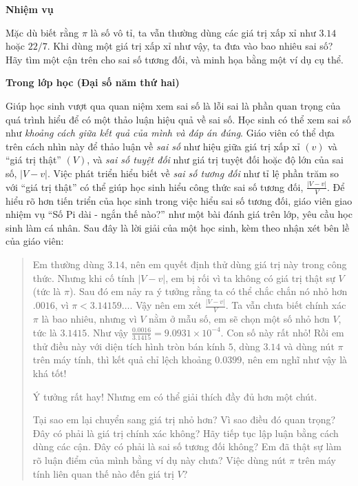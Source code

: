   {
    \textbf{Nhiệm vụ}

    Mặc dù biết rằng $\pi$ là số vô tỉ, ta vẫn thường dùng các giá trị xấp xỉ như $3.14$ hoặc $22/7$. Khi dùng một giá trị xấp xỉ như vậy, ta đưa vào bao nhiêu sai số? Hãy tìm một cận trên cho sai số tương đối, và minh họa bằng một ví dụ cụ thể.

    \textbf{Trong lớp học (Đại số năm thứ hai)}

    Giúp học sinh vượt qua quan niệm xem sai số là lỗi sai là phần quan trọng của quá trình hiểu để có một thảo luận hiệu quả về sai số. Học sinh có thể xem sai số như \emph{khoảng cách giữa kết quả của mình và đáp án đúng}. Giáo viên có thể dựa trên cách nhìn này để thảo luận về \emph{sai số} như hiệu giữa giá trị xấp xỉ $(v)$ và ``giá trị thật'' $(V)$, và \emph{sai số tuyệt đối} như giá trị tuyệt đối hoặc độ lớn của sai số, $\lvert V - v\rvert$. Việc phát triển hiểu biết về \emph{sai số tương đối} như tỉ lệ phần trăm so với ``giá trị thật'' có thể giúp học sinh hiểu công thức sai số tương đối, $\frac{\lvert V - v\rvert}{V}$. Để hiểu rõ hơn tiến triển của học sinh trong việc hiểu sai số tương đối, giáo viên giao nhiệm vụ ``Số Pi dài - ngắn thế nào?'' như một bài đánh giá trên lớp, yêu cầu học sinh làm cá nhân. Sau đây là lời giải của một học sinh, kèm theo nhận xét bên lề của giáo viên:

    \begin{quote}
      Em thường dùng $3.14$, nên em quyết định thử dùng giá trị này trong công thức. Nhưng khi cố tính $\lvert V - v\rvert$, em bị rối vì ta không có giá trị thật sự $V$ (tức là $\pi$). Sau đó em nảy ra ý tưởng rằng ta có thể chắc chắn nó nhỏ hơn $.0016$, vì $\pi < 3.14159\dots$. Vậy nên em xét $\frac{\lvert V - v\rvert}{V}$. Ta vẫn chưa biết chính xác $\pi$ là bao nhiêu, nhưng vì $V$ nằm ở mẫu số, em sẽ chọn một số nhỏ hơn $V$, tức là $3.1415$. Như vậy $\frac{0.0016}{3.1415}=9.0931\times 10^{-4}$. Con số này rất nhỏ! Rồi em thử điều này với diện tích hình tròn bán kính $5$, dùng $3.14$ và dùng nút $\pi$ trên máy tính, thì kết quả chỉ lệch khoảng $0.0399$, nên em nghĩ như vậy là khá tốt!\vspace{\baselineskip}

      \begin{scriptlist}
        \item[Giáo viên:] Ý tưởng rất hay! Nhưng em có thể giải thích đầy đủ hơn một chút.
        
        \item[Giáo viên:] Tại sao em lại chuyển sang giá trị nhỏ hơn? Vì sao điều đó quan trọng? Đây có phải là giá trị chính xác không? Hãy tiếp tục lập luận bằng cách dùng các cận. Đây có phải là sai số tương đối không? Em đã thật sự làm rõ luận điểm của mình bằng ví dụ này chưa? Việc dùng nút $\pi$ trên máy tính liên quan thế nào đến giá trị $V$?
      \end{scriptlist}
    \end{quote}

}

